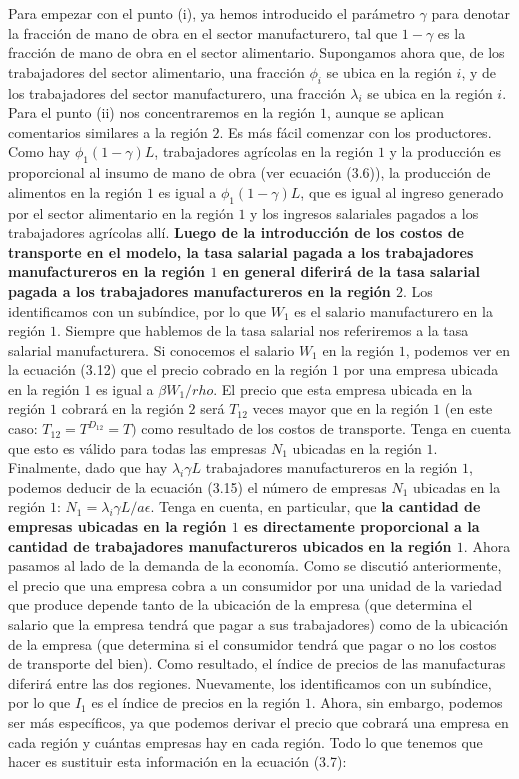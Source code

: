 Para empezar con el punto (i), ya hemos introducido el parámetro $\gamma$ para denotar la fracción de mano de obra en el sector manufacturero,  tal que $1 - \gamma$ es la fracción de mano de obra en el sector alimentario. Supongamos ahora que, de los trabajadores del sector alimentario, una fracción $\phi_i$ se ubica en la región $i$, y de los trabajadores del sector manufacturero, una fracción $\lambda_i$ se ubica en la región $i$. \\
Para el  punto (ii) nos concentraremos en la región $1$, aunque se aplican comentarios similares a la región $2$. Es más fácil comenzar con los productores. Como hay $\phi_1 (1-\gamma)L$, trabajadores agrícolas en la región $1$ y la producción es proporcional al insumo de mano de obra (ver ecuación (3.6)), la producción de alimentos en la región $1$ es igual a $\phi_1(1-\gamma)L$, que es igual al ingreso generado por el sector alimentario en la región $1$ y los ingresos salariales pagados a los trabajadores agrícolas allí. \textbf{Luego de la introducción de los costos de transporte en el modelo, la tasa salarial pagada a los trabajadores manufactureros en la región $1$ en general diferirá de la tasa salarial pagada a los trabajadores manufactureros en la región $2$}. Los identificamos con un subíndice, por lo que $W_1$ es el salario manufacturero en la región $1$. Siempre que hablemos de la tasa salarial nos referiremos a la tasa salarial manufacturera. Si conocemos el salario $W_1$ en la región $1$, podemos ver en la ecuación (3.12) que el precio cobrado en la región $1$ por una empresa ubicada en la región $1$ es igual a $\beta W_1/rho$. El precio que esta empresa ubicada en la región $1$ cobrará en la región $2$ será $T_{12}$ veces mayor que en la región $1$ (en este caso: $T_{12} = T^{D_{12}} = T)$ como resultado de los costos de transporte. Tenga en cuenta que esto es válido para todas las empresas $N_1$ ubicadas en la región $1$. Finalmente, dado que hay $\lambda_i \gamma L$ trabajadores manufactureros en la región $1$, podemos deducir de la ecuación (3.15) el número de empresas $N_1$ ubicadas en la región $1$: $N_1 = \lambda_i \gamma L / a\epsilon$. Tenga en cuenta, en particular, que \textbf{\boldmath la cantidad de empresas ubicadas en la región $1$ es directamente proporcional a la cantidad de trabajadores manufactureros ubicados en la región $1$}. Ahora pasamos al lado de la demanda de la economía. Como se discutió anteriormente, el precio que una empresa cobra a un consumidor por una unidad de la variedad que produce depende tanto de la ubicación de la empresa (que determina el salario que la empresa tendrá que pagar a sus trabajadores) como de la ubicación de la empresa (que determina si el consumidor tendrá que pagar o no los costos de transporte del bien). Como resultado, el índice de precios de las manufacturas diferirá entre las dos regiones. Nuevamente, los identificamos con un subíndice, por lo que $I_1$ es el índice de precios en la región $1$. Ahora, sin embargo, podemos ser más específicos, ya que podemos derivar el precio que cobrará una empresa en cada región y cuántas empresas hay en cada región. Todo lo que tenemos que hacer es sustituir esta información en la ecuación (3.7):

